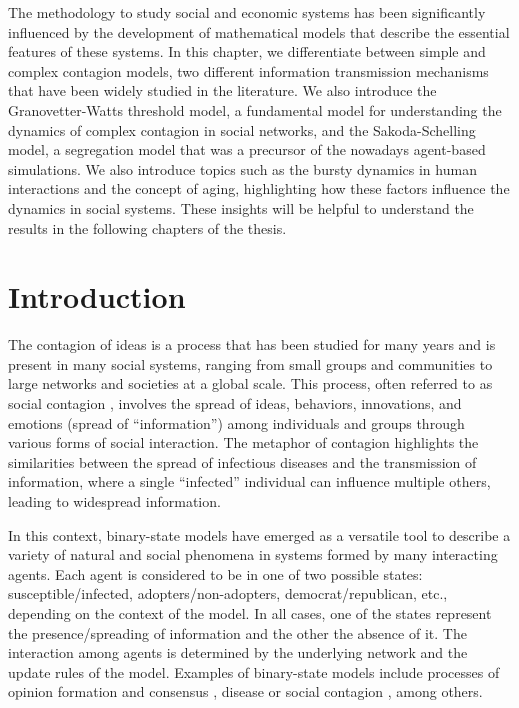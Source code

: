 The methodology to study social and economic systems has been significantly influenced by the development of mathematical models that describe the essential features of these systems. In this chapter, we differentiate between simple and complex contagion models, two different information transmission mechanisms that have been widely studied in the literature. We also introduce the Granovetter-Watts threshold model, a fundamental model for understanding the dynamics of complex contagion in social networks, and the Sakoda-Schelling model, a segregation model that was a precursor of the nowadays agent-based simulations. We also introduce topics such as the bursty dynamics in human interactions and the concept of aging, highlighting how these factors influence the dynamics in social systems. These insights will be helpful to understand the results in the following chapters of the thesis.

\section{\label{sec:Introduction} Introduction}

The contagion of ideas is a process that has been studied for many years and is present in many social systems, ranging from small groups and communities to large networks and societies at a global scale. This process, often referred to as social contagion \cite{christakis2013social}, involves the spread of ideas, behaviors, innovations, and emotions (spread of ``information'') among individuals and groups through various forms of social interaction. The metaphor of contagion highlights the similarities between the spread of infectious diseases and the transmission of information, where a single ``infected'' individual can influence multiple others, leading to widespread information.

In this context, binary-state models have emerged as a versatile tool to describe a variety of natural and social phenomena in systems formed by many interacting agents. Each agent is considered to be in one of two possible states: susceptible/infected, adopters/non-adopters, democrat/republican, etc., depending on the context of the model. In all cases, one of the states represent the presence/spreading of information and the other the absence of it. The interaction among agents is determined by the underlying network and the update rules of the model. Examples of binary-state models include processes of opinion formation and consensus \cite{Voter-original,sood-2005,fernandez-gracia-2014,redner-2019}, disease or social contagion \cite{granovetter-1978,pastor-satorras-2015}, among others. 

